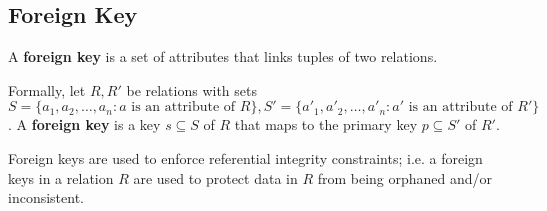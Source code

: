 \documentclass{report}
\newenvironment{definition}[1]{\begin{tcolorbox}[title={Definition: #1}]}{\end{tcolorbox}}
\renewcommand{\bf}[1]{\textbf{{#1}}}
\begin{document}
\subsection{Foreign Key}
\begin{definition}{Foreign Key}
    A \bf{foreign key} is a set of attributes that links tuples of two relations.\vspace{10pt}

    Formally, let $R, R'$ be relations with sets $S = \{a_1, a_2, \ldots, a_n : a 
        \text{ is an attribute of } R\}, S' = \{a'_1, a'_2, \ldots, a'_n : a' \text{ is an attribute of }
    R'\}$. A \bf{foreign key} is a key $s \subseteq S$ of $R$ that maps to the primary key 
    $p \subseteq S'$ of $R'$.
\end{definition}
Foreign keys are used to enforce referential integrity constraints; i.e. a foreign keys in a 
relation $R$ are used to protect data in $R$ from being orphaned and/or inconsistent.
\end{document}
